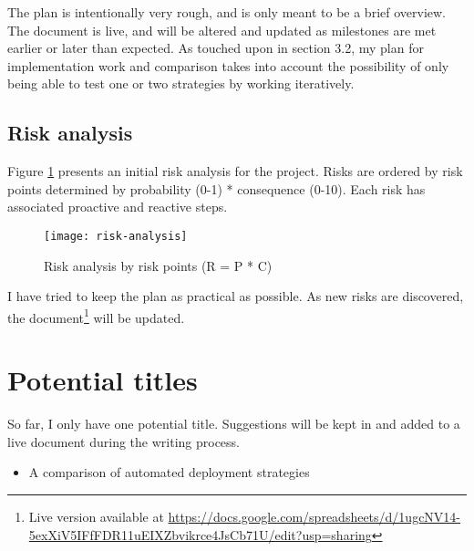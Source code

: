 The plan is intentionally very rough, and is only meant to be a brief overview. The document is live, and will be altered and updated as milestones are met earlier or later than expected. As touched upon in section 3.2, my plan for implementation work and comparison takes into account the possibility of only being able to test one or two strategies by working iteratively.

\subsection{Risk analysis}

Figure \ref{fig:risk-analysis} presents an initial risk analysis for the project. Risks are ordered by risk points determined by probability (0-1) * consequence (0-10). Each risk has associated proactive and reactive steps.

\begin{figure}[H]
    \label{fig:risk-analysis}
\centerline{\texttt{[image: risk-analysis]}}
    \caption{Risk analysis by risk points (R = P * C)}
\end{figure}

I have tried to keep the plan as practical as possible. As new risks are discovered, the document\footnote{Live version available at \url{https://docs.google.com/spreadsheets/d/1ugcNV14-5exXiV5IFfFDR11uEIXZbvikrce4JsCb71U/edit?usp=sharing}} will be updated.

\section{Potential titles}

So far, I only have one potential title. Suggestions will be kept in and added to a live document during the writing process.

\begin{itemize}
  \item A comparison of automated deployment strategies
\end{itemize}
